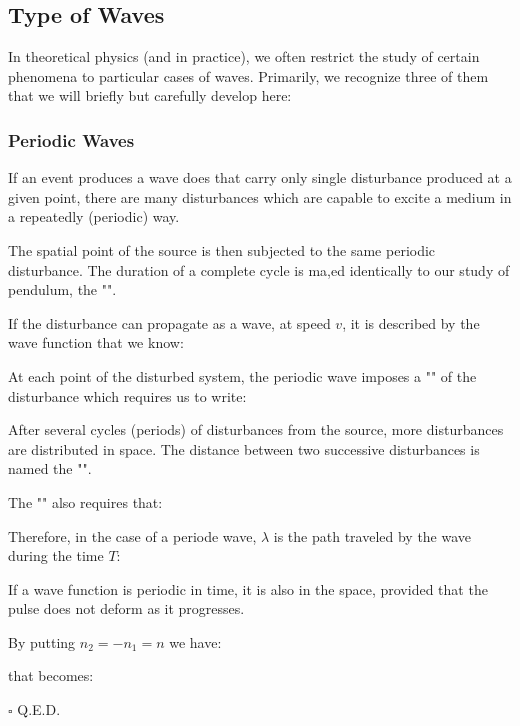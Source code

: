 	\subsection{Type of Waves}
	In theoretical physics (and in practice), we often restrict the study of certain phenomena to particular cases of waves. Primarily, we recognize three of them that we will briefly but carefully develop here:
	
	\subsubsection{Periodic Waves}
	If an event produces a wave does that carry only single disturbance produced at a given point, there are many disturbances which are capable to excite a medium in a repeatedly (periodic) way.
	
	The spatial point of the source is then subjected to the same periodic disturbance. The duration of a complete cycle is ma,ed identically to our study of pendulum, the "".
	
	If the disturbance can propagate as a wave, at speed $v$, it is described by the wave function that we know:
	
	At each point of the disturbed system, the periodic wave imposes a "" of the disturbance which requires us to write:
	
	After several cycles (periods) of disturbances from the source, more disturbances are distributed in space. The distance between two successive disturbances is named the "".
	
	The "" also requires that:
	
	Therefore, in the case of a periode wave, $\lambda$ is the path traveled by the wave during the time $T$:
	
	\begin{theorem}
	If a wave function is periodic in time, it is also in the space, provided that the pulse does not deform as it progresses.
	\end{theorem}
	\begin{dem}
	
	By putting $n_2=-n_1=n$ we have:
	
	that becomes:
	
	\begin{flushright}
		$\square$  Q.E.D.
	\end{flushright}
	\end{dem}
	
